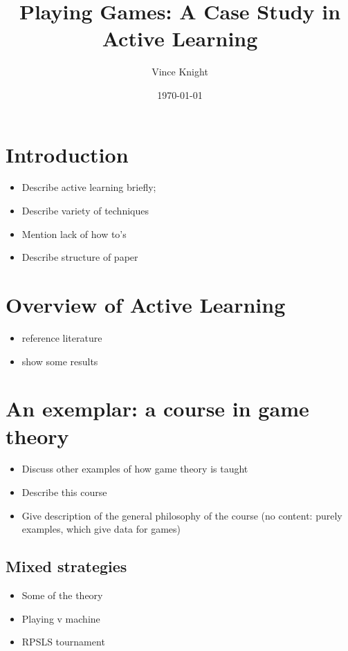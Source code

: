 \documentclass{article}
\title{Playing Games: A Case Study in Active Learning}
\author{Vince Knight}
\date{\today}
\begin{document}
\maketitle


\section{Introduction}

\begin{itemize}
    \item Describe active learning briefly;
    \item Describe variety of techniques
    \item Mention lack of how to's
    \item Describe structure of paper
\end{itemize}

\section{Overview of Active Learning}

\begin{itemize}
    \item reference literature
    \item show some results
\end{itemize}

\section{An exemplar: a course in game theory}

\begin{itemize}
    \item Discuss other examples of how game theory is taught
    \item Describe this course
    \item Give description of the general philosophy of the course (no content:
        purely examples, which give data for games)
\end{itemize}

\subsection{Mixed strategies}

\begin{itemize}
    \item Some of the theory
    \item Playing v machine
    \item RPSLS tournament
\end{itemize}
\end{document}

